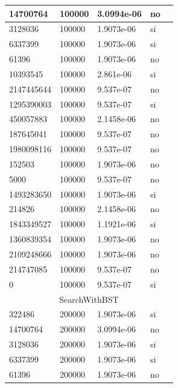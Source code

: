 \documentclass[12pt, fleqn]{article}                             %
\theoremstyle{break}                                            %
\begin{document}
\begin{longtable}{|m{5em}|m{5em}|m{10em}|m{5em}|@{}m{0pt}@{}}
            14700764& 100000  & 3.0994e-06 & no &\\[1em]    \hline
            3128036& 100000  & 1.9073e-06 & si &\\[1em]    \hline
            6337399& 100000  & 1.9073e-06 & si &\\[1em]    \hline
            61396& 100000  & 1.9073e-06 & no &\\[1em]    \hline
            10393545& 100000  & 2.861e-06 & si &\\[1em]    \hline
            2147445644& 100000  & 9.537e-07 & no &\\[1em]    \hline
            1295390003& 100000  & 9.537e-07 & si &\\[1em]    \hline
            450057883& 100000  & 2.1458e-06 & no &\\[1em]    \hline
            187645041& 100000  & 9.537e-07 & no &\\[1em]    \hline
            1980098116& 100000  & 9.537e-07 & no &\\[1em]    \hline
            152503& 100000  & 1.9073e-06 & no &\\[1em]    \hline
            5000& 100000  & 9.537e-07 & no &\\[1em]    \hline
            1493283650& 100000  & 1.9073e-06 & si &\\[1em]    \hline
            214826& 100000  & 2.1458e-06 & no &\\[1em]    \hline
            1843349527& 100000  & 1.1921e-06 & si &\\[1em]    \hline
            1360839354& 100000  & 1.9073e-06 & no &\\[1em]    \hline
            2109248666& 100000  & 1.9073e-06 & no &\\[1em]    \hline
            214747085& 100000  & 9.537e-07 & no &\\[1em]    \hline
            0& 100000  & 9.537e-07 & si &\\[1em]    \hline
            \multicolumn{5}{|c|}{SearchWithBST}   \\          \hline
            322486& 200000  & 1.9073e-06 & si &\\[1em]    \hline
            14700764& 200000  & 3.0994e-06 & no &\\[1em]    \hline
            3128036& 200000  & 1.9073e-06 & si &\\[1em]    \hline
            6337399& 200000  & 1.9073e-06 & si &\\[1em]    \hline
            61396& 200000  & 1.9073e-06 & no &\\[1em]    \hline

\end{longtable}
\end{document}
